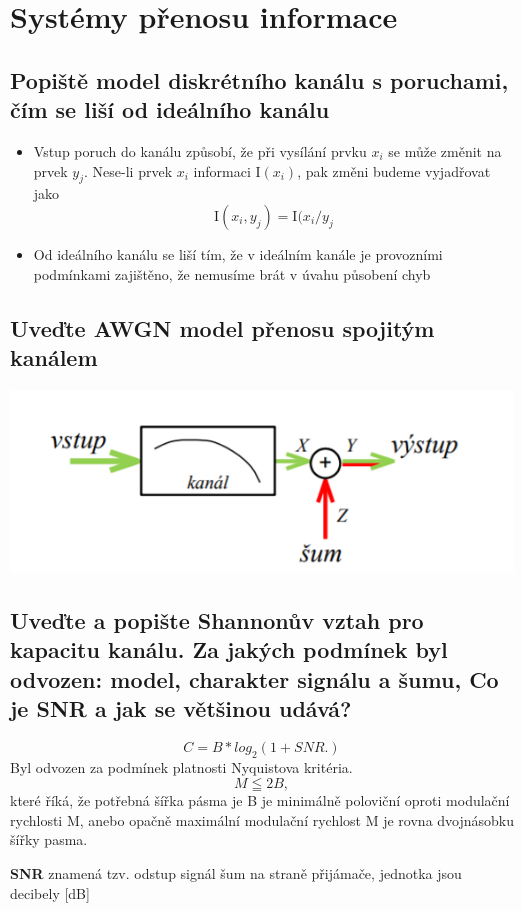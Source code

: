 \clearpage
\section{Systémy přenosu informace}
\subsection{Popiště model diskrétního kanálu s poruchami, čím se liší od ideálního kanálu}
\begin{itemize}
    \item Vstup poruch do kanálu způsobí, že při vysílání prvku $x_i$ se může změnit na prvek $y_j$.
    Nese-li prvek $x_i$ informaci I$(x_i)$, pak změni budeme vyjadřovat jako
    $$\mathrm{I}(x_i, y_j) = \mathrm{I}(x_i / y_j$$
    \item Od ideálního kanálu se liší tím, že v ideálním kanále je provozními podmínkami zajištěno, že nemusíme brát v úvahu působení chyb
\end{itemize}

\subsection{Uveďte AWGN model přenosu spojitým kanálem}
\includegraphics[]{images/AWGN.png}

\subsection{Uveďte a popište Shannonův vztah pro kapacitu kanálu. Za jakých podmínek byl odvozen: model, charakter signálu a šumu, Co je SNR a jak se většinou udává?}
$$C = B*log_2(1+SNR.)$$
Byl odvozen za podmínek platnosti Nyquistova kritéria.
$$M \leqq 2B,$$ které říká, že potřebná šířka pásma je B je minimálně poloviční oproti modulační rychlosti M, anebo opačně maximální modulační rychlost M je rovna dvojnásobku šířky pasma.

\textbf{SNR} znamená tzv. odstup signál šum na straně přijámače, jednotka jsou decibely [dB]

